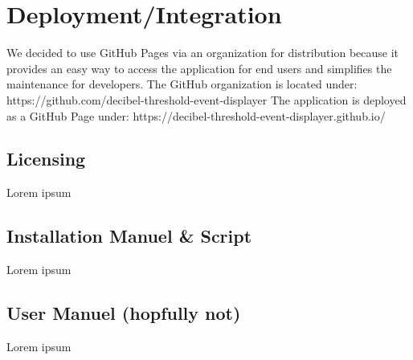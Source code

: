 \section{Deployment/Integration}
We decided to use GitHub Pages via an organization for distribution because it provides an easy way to access the
application for end users and simplifies the maintenance for developers.
The GitHub organization is located under: https://github.com/decibel-threshold-event-displayer
The application is deployed as a GitHub Page under: https://decibel-threshold-event-displayer.github.io/


\subsection{Licensing}
Lorem ipsum

\subsection{Installation Manuel \& Script}
Lorem ipsum

\subsection{User Manuel (hopfully not)}
Lorem ipsum


